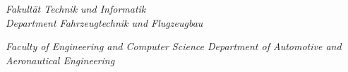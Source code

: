 {\begin{titlepage}
\vfill

{
\setlength{\parindent}{0cm} %

\calibriFont

\begin{minipage}{0.49\linewidth}
    \begin{flushleft}
    {\normalsize \textit{Fakultät Technik und Informatik\\
     Department Fahrzeugtechnik und Flugzeugbau}
    }
  \end{flushleft}
 \end{minipage}
    \hfill
\begin{minipage}{0.49\linewidth}
   \begin{flushright}
      {\normalsize \textit{Faculty of Engineering and Computer Science
        Department of Automotive and\\
        Aeronautical Engineering}
      }
  \end{flushright}
\end{minipage}
}

\end{titlepage}
}